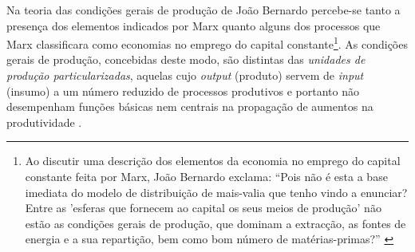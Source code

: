 Na teoria das condições gerais de produção de João Bernardo percebe-se tanto a presença dos elementos indicados por Marx quanto alguns dos processos que Marx classificara como economias no emprego do capital constante\footnote{Ao discutir uma descrição dos elementos da economia no emprego do capital constante feita por Marx, João Bernardo exclama: ``Pois não é esta a base imediata do modelo de distribuição de mais-valia que tenho vindo a enunciar? Entre as 'esferas que fornecem ao capital os seus meios de produção' não estão as condições gerais de produção, que dominam a extracção, as fontes de energia e a sua repartição, bem como bom número de matérias-primas?'' \cite[p.~114]{BERNARDO1977b}}. As condições gerais de produção, concebidas deste modo, são distintas das \textit{unidades de produção particularizadas}, aquelas cujo \textit{output} (produto) servem de \textit{input} (insumo) a um número reduzido de processos produtivos e portanto não desempenham funções básicas nem centrais na propagação de aumentos na produtividade \cite[p.~158]{BERNARDO1991}.

